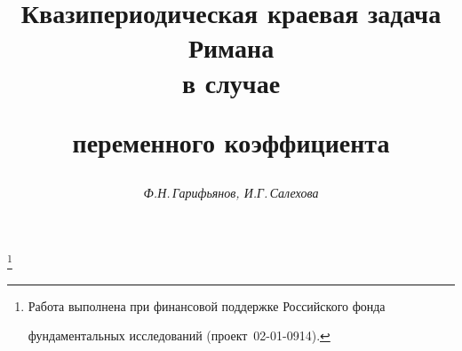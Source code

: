 

 




 


\newcommand{\const}{\operatorname{const}} 


\newcommand{\re}{\operatorname{Re}} 


\newcommand{\ctg}{\operatorname{ctg}} 


\newcommand{\tts}[1]{} 


 




\setcounter{page}{25} 












 


\author{\it Ф.Н.\,Гарифьянов, И.Г.\,Салехова} 




\title{Квазипериодическая краевая задача Римана\\ в случае  


переменного коэффициента} 


\thanks{Работа выполнена при финансовой поддержке Российского фонда 


фундаментальных исследований (проект \No\,02-01-0914).} 


 


\date{} 




\pagestyle{plain} %


